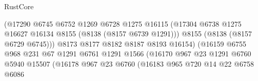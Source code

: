 \begin{lexlean}{RustCore}
\begin{coremodule}
                                            (@17290
                                              @6745
                                              @6752
                                              @1269
                                              @6728
                                              @1275
                                              @16115
                                              (@17304
                                                @6738
                                                @1275
                                                @16627
                                                @16134
                                                @8155
                                                (@8138 (@8157 @6739 @1291)))
                                              @8155
                                              (@8138 (@8157 @6729 @6745)))
                                            @8173
                                            @8177
                                            @8182
                                            @8187
                                            @8193
                                            @16154)
                                          (@16159
                                            @6755
                                            @968
                                            @231
                                            @67
                                            @1291
                                            @6761
                                            @1291
                                            @1566
                                            (@16170
                                              @967
                                              @23
                                              @1291
                                              @6760
                                              @5940
                                              @15507
                                              (@16178
                                                @967
                                                @23
                                                @6760
                                                (@16183
                                                  @965
                                                  @720
                                                  @14
                                                  @22
                                                  @6758
                                                  @6086

\end{coremodule}
\end{lexlean}
